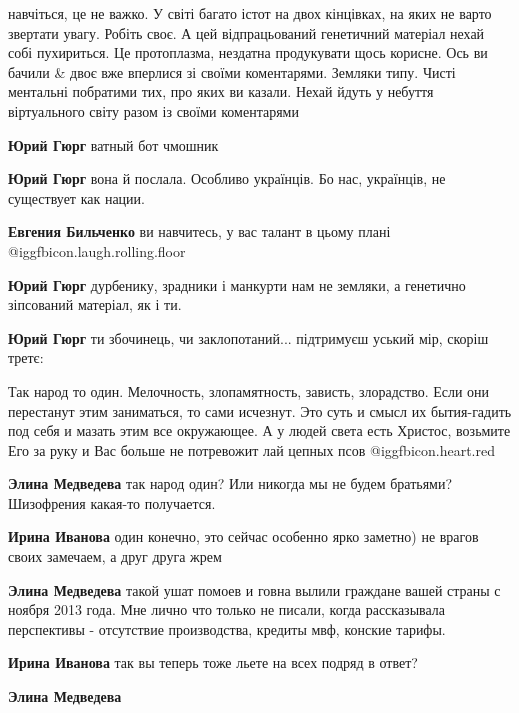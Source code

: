 \begin{itemize}
\begin{itemize}
навчіться, це не важко. У світі багато істот на двох кінцівках, на яких не
варто звертати увагу. Робіть своє. А цей відпрацьований генетичний матеріал
нехай собі пухириться. Це протоплазма, нездатна продукувати щось корисне. Ось
ви бачили \& двоє вже вперлися зі своїми коментарями. Земляки типу. Чисті
ментальні побратими тих, про яких ви казали. Нехай йдуть у небуття віртуального
світу разом із своїми коментарями

\textbf{Юрий Гюрг} ватный бот чмошник

\textbf{Юрий Гюрг} вона й послала. Особливо українців. Бо нас, українців, не существует как нации.

\textbf{Евгения Бильченко} ви навчитесь, у вас талант в цьому плані @igg{fbicon.laugh.rolling.floor} 

\textbf{Юрий Гюрг} дурбенику, зрадники і манкурти нам не земляки, а генетично зіпсований матеріал, як і ти.

\textbf{Юрий Гюрг} ти збочинець, чи заклопотаний... підтримуєш уський мір, скоріш третє:

\end{itemize} %


Так народ то один. Мелочность, злопамятность, зависть, злорадство. Если они
перестанут этим заниматься, то сами исчезнут. Это суть и смысл их бытия-гадить
под себя и мазать этим все окружающее. А у людей света есть Христос, возьмите
Его за руку и Вас больше не потревожит лай цепных псов @igg{fbicon.heart.red}

\begin{itemize} %
\textbf{Элина Медведева} так народ один? Или никогда мы не будем братьями? Шизофрения какая-то получается.

\textbf{Ирина Иванова} один конечно, это сейчас особенно ярко заметно) не врагов своих замечаем, а друг друга жрем

\textbf{Элина Медведева} такой ушат помоев и говна вылили граждане вашей страны с ноября 2013 года. Мне лично что только не писали, когда рассказывала перспективы - отсутствие производства, кредиты мвф, конские тарифы.

\textbf{Ирина Иванова} так вы теперь тоже льете на всех подряд в ответ?

\textbf{Элина Медведева} 


\end{itemize}
\end{itemize}
